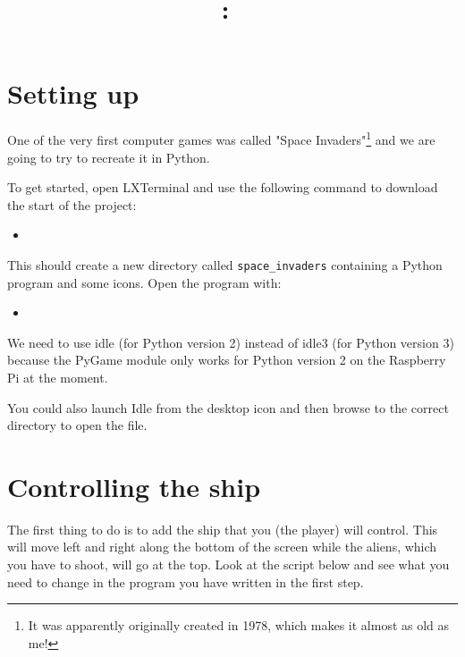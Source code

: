 \documentclass{article}
\title{
\vspace{2in}
\textmd{\textbf{\hmwkClass:\ \hmwkTitle}}\\
\vspace{3in}
}
\date{} %
\newcommand{\bashscript}[2]{
\begin{itemize}
\item[]
\end{itemize}
}
\newenvironment{hint}{
  \begin{tcolorbox}[colback=green!5,colframe=green!40!black,title=Note]}
{\end{tcolorbox}}
\begin{document}
\maketitle



\newpage


\section{Setting up}

One of the very first computer games was called "Space Invaders"\footnote{It
was apparently originally created in 1978, which makes it almost as old as me!}
and we are going to try to recreate it in Python.

To get started, open LXTerminal and use the following command to download the
start of the project:

\bashscript{setup}{Get the the starting point}

This should create a new directory called \texttt{space\_invaders} containing
a Python program and some icons. Open the program with:

\bashscript{openscript}{Opening the starting point}

\begin{hint}
We need to use idle (for Python version 2) instead of idle3 (for Python
version 3) because the PyGame module only works for Python version 2 on the
Raspberry Pi at the moment.

You could also launch Idle from the desktop icon and then browse to the
correct directory to open the file.
\end{hint}

\section{Controlling the ship}

The first thing to do is to add the ship that you (the player) will control.
This will move left and right along the bottom of the screen while the aliens,
which you have to shoot, will go at the top. Look at the script below and see
what you need to change in the program you have written in the first step.
\end{document}
